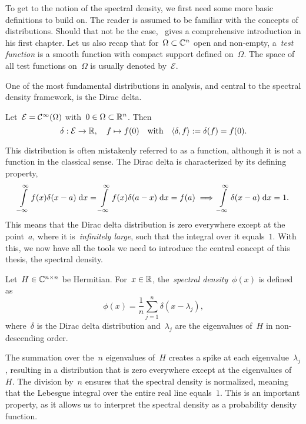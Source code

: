 To get to the notion of the spectral density, we first need some more basic definitions to build on.
The reader is assumed to be familiar with the concepts of distributions. Should that not be the case,~\cite{strichartz} gives a comprehensive introduction in his first chapter. Let us also recap that for~$\Omega \subset \mathbb{C}^n$ open and non-empty, a~\emph{test function} is a smooth function with compact support defined on~$\Omega$. The space of all test functions on~$\Omega$ is usually denoted by~$\mathcal{E}$.

One of the most fundamental distributions in analysis, and central to the spectral density framework, is the Dirac delta.

\begin{definition}
    Let~$\mathcal{E} = \mathcal{C}^{\infty}(\Omega)$ with~$0 \in \Omega \subset \mathbb{R}^n$.
    Then
    \[
    \delta: \mathcal{E} \to \mathbb{R}, \quad f \mapsto f(0) \quad \text{with} \quad \langle \delta, f \rangle := \delta(f) = f(0).
    \]
\end{definition}
\noindent
This distribution is often mistakenly referred to as a function, although it is not a function in the classical sense. The Dirac delta is characterized by its defining property,
\[
\int\limits_{-\infty}^{\infty} f(x) \delta(x-a) \;\mathrm{d}x = \int\limits_{-\infty}^{\infty} f(x) \delta(a-x) \;\mathrm{d}x = f(a) \implies \int\limits_{-\infty}^{\infty} \delta(x-a) \;\mathrm{d}x = 1.
\]
This means that the Dirac delta distribution is zero everywhere except at the point~$a$, where it is~\emph{infinitely large}, such that the integral over it equals~$1$. With this, we now have all the tools we need to introduce the central concept of this thesis, the spectral density.

\begin{definition}
    Let~$H \in \mathbb{C}^{n \times n}$ be Hermitian. For~$x \in \mathbb{R}$, the~\emph{spectral density}~$\phi(x)$ is defined as
    \[
    \phi(x) = \frac{1}{n} \sum_{j=1}^{n} \delta(x - \lambda_j),
    \]
    where~$\delta$ is the Dirac delta distribution and~$\lambda_j$ are the eigenvalues of~$H$ in non-descending order.
\end{definition}

The summation over the~$n$ eigenvalues of~$H$ creates a spike at each eigenvalue~$\lambda_j$, resulting in a distribution that is zero everywhere except at the eigenvalues of~$H$. The division by~$n$ ensures that the spectral density is normalized, meaning that the Lebesgue integral over the entire real line equals~$1$. This is an important property, as it allows us to interpret the spectral density as a probability density function.

